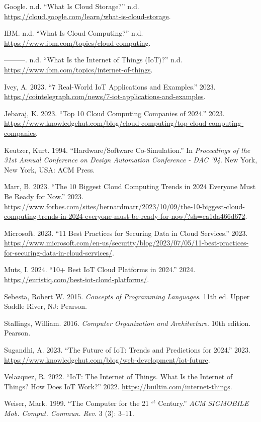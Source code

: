 \documentclass[
  letterpaper,
  DIV=11,
  numbers=noendperiod]{scrreprt}
\newlength{\cslhangindent}
\newenvironment{CSLReferences}[2] %
 {\begin{list}{}{%
  \setlength{\itemindent}{0pt}
  \setlength{\leftmargin}{0pt}
  \setlength{\parsep}{0pt}
  \ifodd #1
   \setlength{\leftmargin}{\cslhangindent}
   \setlength{\itemindent}{-1\cslhangindent}
  \fi
  \setlength{\itemsep}{#2\baselineskip}}}
 {\end{list}}
\begin{document}
\begin{CSLReferences}{1}{0}
Google. n.d. {``What Is Cloud Storage?''} n.d.
\url{https://cloud.google.com/learn/what-is-cloud-storage}.

IBM. n.d. {``What Is Cloud Computing?''} n.d.
\url{https://www.ibm.com/topics/cloud-computing}.

---------. n.d. {``What Is the Internet of Things (IoT)?''} n.d.
\url{https://www.ibm.com/topics/internet-of-things}.

Ivey, A. 2023. {``7 Real-World IoT Applications and Examples.''} 2023.
\url{https://cointelegraph.com/news/7-iot-applications-and-examples}.

Jebaraj, K. 2023. {``Top 10 Cloud Computing Companies of 2024.''} 2023.
\url{https://www.knowledgehut.com/blog/cloud-computing/top-cloud-computing-companies}.

Keutzer, Kurt. 1994. {``Hardware/Software Co-Simulation.''} In
\emph{Proceedings of the 31st Annual Conference on Design Automation
Conference - {DAC} '94}. New York, New York, USA: ACM Press.

Marr, B. 2023. {``The 10 Biggest Cloud Computing Trends in 2024 Everyone
Must Be Ready for Now.''} 2023.
\url{https://www.forbes.com/sites/bernardmarr/2023/10/09/the-10-biggest-cloud-computing-trends-in-2024-everyone-must-be-ready-for-now/?sh=ea1da466d672}.

Microsoft. 2023. {``11 Best Practices for Securing Data in Cloud
Services.''} 2023.
\url{https://www.microsoft.com/en-us/security/blog/2023/07/05/11-best-practices-for-securing-data-in-cloud-services/}.

Muts, I. 2024. {``10+ Best IoT Cloud Platforms in 2024.''} 2024.
\url{https://euristiq.com/best-iot-cloud-platforms/}.

Sebesta, Robert W. 2015. \emph{Concepts of Programming Languages}. 11th
ed. Upper Saddle River, NJ: Pearson.

Stallings, William. 2016. \emph{Computer Organization and Architecture}.
10th edition. Pearson.

Sugandhi, A. 2023. {``The Future of IoT: Trends and Predictions for
2024.''} 2023.
\url{https://www.knowledgehut.com/blog/web-development/iot-future}.

Velazquez, R. 2022. {``IoT: The Internet of Things. What Is the Internet
of Things? How Does IoT Work?''} 2022.
\url{https://builtin.com/internet-things}.

Weiser, Mark. 1999. {``The Computer for the 21 \(^{st}\) Century.''}
\emph{ACM SIGMOBILE Mob. Comput. Commun. Rev.} 3 (3): 3--11.

\end{CSLReferences}
\end{document}
